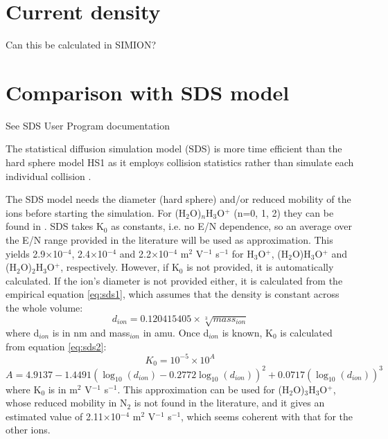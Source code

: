 \section{Current density}
Can this be calculated in SIMION?

\newpage
\section{Comparison with SDS model}
See SDS User Program documentation

The statistical diffusion simulation model (SDS) is more time efficient than the hard sphere model HS1 as it employs collision statistics rather than simulate each individual collision \cite{APPELHANS20051}.




The SDS model needs the diameter (hard sphere) and/or reduced mobility of the ions before starting the simulation. %
For (H$_2$O)$_n$H$_3$O$^+$ (n=0, 1, 2) they can be found in \cite{Dotan}. SDS takes K$_0$ as constants, i.e. no E/N dependence, so an average over the E/N range provided in the literature will be used as approximation. This yields  2.9$\times$10$^{-4}$, 2.4$\times$10$^{-4}$ and 2.2$\times$10$^{-4}$ m$^2$ V$^{-1}$ s$^{-1}$ for H$_3$O$^+$, (H$_2$O)H$_3$O$^+$ and (H$_2$O)$_2$H$_3$O$^+$, respectively. However, if K$_0$ is not provided, it is automatically calculated. If the ion's diameter is not provided either, it is calculated from the empirical equation \ref{eq:sds1}, which assumes that the density is constant across the whole volume:
\begin{equation}
\label{eq:sds1}
d_{ion} = 0.120415405 \times \sqrt[3]{mass_{ion}}
\end{equation}
where d$_{ion}$ is in nm and mass$_{ion}$ in amu. Once d$_{ion}$ is known, K$_0$ is calculated from equation \ref{eq:sds2}:
\begin{equation}
\label{eq:sds2}
K_0 = 10^{-5} \times 10^A
\end{equation}
\begin{equation}
A = 4.9137 - 1.4491 (\log_{10} (d_{ion}) - 0.2772\log_{10} (d_{ion}))^2 + 0.0717 (\log_{10} (d_{ion}))^3
\end{equation}
where K$_{0}$ is in m$^2$ V$^{-1}$ s$^{-1}$. This approximation can be used for (H$_2$O)$_3$H$_3$O$^+$, whose reduced mobility in N$_2$ is not found in the literature, and it gives an estimated value of 2.11$\times$10$^{-4}$ m$^2$ V$^{-1}$ s$^{-1}$, which seems coherent with that for the other ions. 










